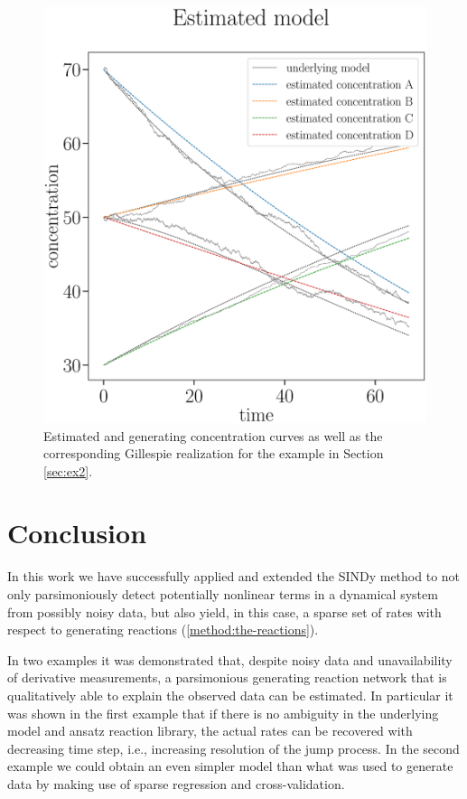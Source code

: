 \documentclass[oneside, abstracton, titlepage]{scrartcl}
\begin{document}
	\begin{figure}
		\begin{center}
			\includegraphics[width=.5\textwidth]{./figures_tex/cv_expected_estimated_concentrations}
		\end{center}
		\caption{Estimated and generating concentration curves as well as the corresponding Gillespie realization for the example in Section \ref{sec:ex2}.}
		\label{ex2:result}
	\end{figure}
	
	\section{Conclusion}
	In this work we have successfully applied and extended the SINDy method to not only parsimoniously detect potentially nonlinear terms in a dynamical system from possibly noisy data, but also yield, in this case, a sparse set of rates with respect to generating reactions (\ref{method:the-reactions}).
	
	In two examples it was demonstrated that, despite noisy data and unavailability of derivative measurements, a parsimonious generating reaction network that is qualitatively able to explain the observed data can be estimated. 
	In particular it was shown in the first example that if there is no ambiguity in the underlying model and ansatz reaction library, the actual rates can be recovered with decreasing time step, i.e., increasing resolution of the jump process. 
	In the second example we could obtain an even simpler model than what was used to generate data by making use of sparse regression and cross-validation.
	
	\newpage
% 	
	
	
	
\end{document}
